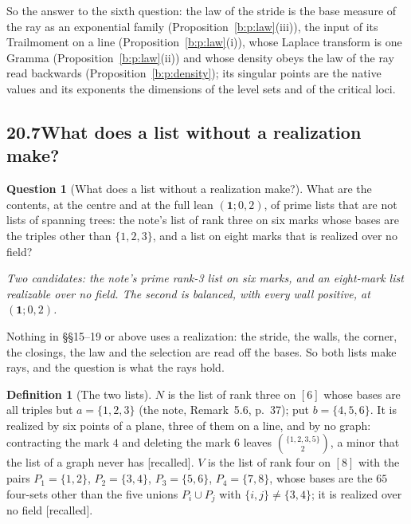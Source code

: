 \documentclass[11pt]{article}
\newcommand{\one}{\mathbf 1}
\theoremstyle{plain}
\theoremstyle{definition}
\newtheorem{definition}[proposition]{Definition}
\newtheorem{question}[proposition]{Question}
\theoremstyle{remark}
\newcommand{\recalled}{\textup{[recalled]}}
\begin{document}
So the answer to the sixth question: the law of the stride is the base measure of the ray as an exponential family (Proposition~\ref{b:p:law}(iii)), the input of its Trailmoment on a line (Proposition~\ref{b:p:law}(i)), whose Laplace transform is one Gramma (Proposition~\ref{b:p:law}(ii)) and whose density obeys the law of the ray read backwards (Proposition~\ref{b:p:density}); its singular points are the native values and its exponents the dimensions of the level sets and of the critical loci.

\subsection*{20.7\quad What does a list without a realization make?}

\begin{question}[What does a list without a realization make?]\label{a:q:unreal}
What are the contents, at the centre and at the full lean $(\one;0,2)$, of prime lists that are not lists of spanning trees: the note's list of rank three on six marks whose bases are the triples other than $\{1,2,3\}$, and a list on eight marks that is realized over no field?
\end{question}

\emph{Two candidates: the note's prime rank-3 list on six marks, and an eight-mark list realizable over no field. The second is balanced, with every wall positive, at $(\one;0,2)$.}

Nothing in \S\S15--19 or above uses a realization: the stride, the walls, the corner, the closings, the law and the selection are read off the bases. So both lists make rays, and the question is what the rays hold.

\begin{definition}[The two lists]\label{b:d:NV}
$N$ is the list of rank three on $[6]$ whose bases are all triples but $a=\{1,2,3\}$ (the note, Remark~5.6, p.~37); put $b=\{4,5,6\}$. It is realized by six points of a plane, three of them on a line, and by no graph: contracting the mark $4$ and deleting the mark $6$ leaves $\binom{\{1,2,3,5\}}2$, a minor that the list of a graph never has \recalled. $V$ is the list of rank four on $[8]$ with the pairs $P_1=\{1,2\}$, $P_2=\{3,4\}$, $P_3=\{5,6\}$, $P_4=\{7,8\}$, whose bases are the $65$ four-sets other than the five unions $P_i\cup P_j$ with $\{i,j\}\neq\{3,4\}$; it is realized over no field \recalled.
\end{definition}
\end{document}

